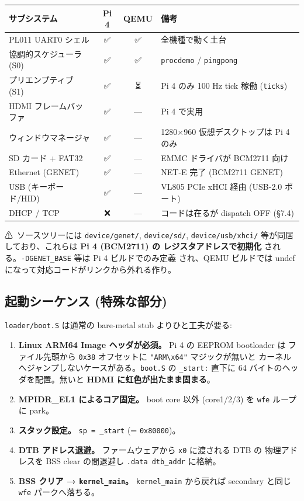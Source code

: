 \documentclass[a4paper,11pt]{ltjsarticle}
\begin{document}
\begin{center}\footnotesize
\begin{tabular}{@{}l c c p{6.4cm}@{}}
\toprule
\textbf{サブシステム} & \textbf{Pi 4} & \textbf{QEMU} & \textbf{備考}\\
\midrule
PL011 UART0 シェル        & ✅ & ✅ & 全機種で動く土台\\
協調的スケジューラ (S0)   & ✅ & ✅ & \verb|procdemo| / \verb|pingpong|\\
プリエンプティブ (S1)     & ✅ & ⏳ & Pi 4 のみ 100 Hz tick 稼働 (\verb|ticks|)\\
HDMI フレームバッファ     & ✅ & — & Pi 4 で実用\\
ウィンドウマネージャ      & ✅ & — & 1280×960 仮想デスクトップは Pi 4 のみ\\
SD カード + FAT32        & ✅ & — & EMMC ドライバが BCM2711 向け\\
Ethernet (GENET)         & ✅ & — & NET-E 完了 (BCM2711 GENET)\\
USB (キーボード/HID)      & ✅ & — & VL805 PCIe xHCI 経由 (USB-2.0 ポート)\\
DHCP / TCP               & ❌ & — & コードは在るが dispatch OFF (§7.4)\\
\bottomrule
\end{tabular}
\end{center}

⚠~ソースツリーには \texttt{device/genet/}, \texttt{device/sd/},
\texttt{device/usb/xhci/} 等が同居しており、これらは \textbf{Pi 4 (BCM2711) の
レジスタアドレスで初期化} される。\verb|-DGENET_BASE| 等は Pi 4 ビルドでのみ定義
され、QEMU ビルドでは undef になって対応コードがリンクから外れる作り。

\subsection{起動シーケンス (特殊な部分)}

\texttt{loader/boot.S} は通常の bare-metal stub よりひと工夫が要る:

\begin{enumerate}[leftmargin=1.6em,itemsep=2pt]
\item \textbf{Linux ARM64 Image ヘッダが必須。} Pi 4 の EEPROM bootloader は
  ファイル先頭から \verb|0x38| オフセットに \verb|"ARM\x64"| マジックが無いと
  カーネルへジャンプしないケースがある。\texttt{boot.S} の \verb|_start:| 直下に
  64 バイトのヘッダを配置。無いと \textbf{HDMI に虹色が出たまま固まる}。
\item \textbf{MPIDR\_EL1 によるコア固定。} boot core 以外 (core1/2/3) を
  \verb|wfe| ループに park。
\item \textbf{スタック設定。} \verb|sp = _start| (= \verb|0x80000|)。
\item \textbf{DTB アドレス退避。} ファームウェアから \verb|x0| に渡される DTB の
  物理アドレスを BSS clear の間退避し \verb|.data dtb_addr| に格納。
\item \textbf{BSS クリア → \texttt{kernel\_main}。} \verb|kernel_main| から戻れば
  secondary と同じ \verb|wfe| パークへ落ちる。
\end{enumerate}
\end{document}
